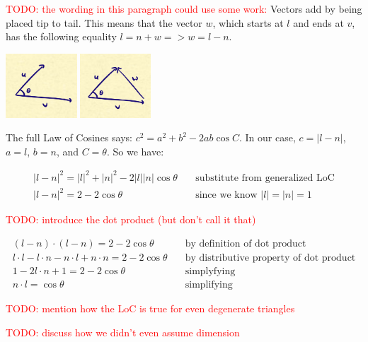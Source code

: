 \documentclass{article}
\newcommand\todo[1]{\textcolor{red}{TODO: #1}}
\begin{document}
\todo{the wording in this paragraph could use some work:}
Vectors add by being placed tip to tail.
This means that the vector $w$, which starts at $l$ and ends at $v$, has the following equality $l = n + w => w = l - n$.

\begin{center}
	\includegraphics[width=0.2\textwidth,frame]{assets/uv.jpg}
	\hspace{0.2\textwidth}
	\includegraphics[width=0.197\textwidth,frame]{assets/uvw.jpg}
\end{center}

The full Law of Cosines says: $c^2 = a^2 + b^2 - 2ab \cos C$.
In our case, $c = | l - n |$, $a = l$, $b = n$, and $C = \theta$.
So we have:

\begin{align*}
|l-n|^2 = |l|^2 + |n|^2 - 2 |l| |n| \cos \theta & \quad \text{substitute from generalized LoC} \\
|l-n|^2 = 2 - 2 \cos \theta & \quad \text{since we know } |l| = |n| = 1
\end{align*}

\todo{introduce the dot product (but don't call it that)}

\begin{align*}
(l - n) \cdot (l - n) = 2 - 2 \cos \theta & \quad \text{by definition of dot product} \\
l \cdot l - l \cdot n - n \cdot l + n \cdot n = 2 - 2 \cos \theta & \quad \text{by distributive property of dot product} \\
1 - 2 l \cdot n + 1 = 2 - 2 \cos \theta & \quad \text{simplyfying} \\
n \cdot l = \cos \theta & \quad \text{simplifying}
\end{align*}

\todo{mention how the LoC is true for even degenerate triangles}

\todo{discuss how we didn't even assume dimension}
\end{document}
